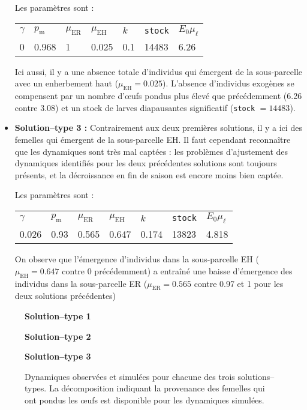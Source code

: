 \begin{itemize}
Les paramètres sont :
 \begin{center}
\begin{tabular}{lllllll}
$\gamma$ & $p_{\text{m}}$ & $\mu_{\text{ER}}$ & $\mu_{\text{EH}}$ & $k$ & \texttt{stock} & $E_0\mu_{\ell}$\\
0 & 0.968 & 1 & 0.025 & 0.1 & 14483 & 6.26
 \end{tabular}
 \end{center}
 Ici aussi, il y a une absence totale d'individus qui émergent de la sous-parcelle avec un enherbement haut ($\mu_{\text{EH}} = 0.025$).
 L'absence d'individus exogènes se compensent par un nombre d'œufs pondus plus élevé que précédemment (6.26 contre 3.08) et un stock de larves diapausantes significatif (\texttt{stock} $=14483$).
 
\item \textbf{Solution--type 3 :}
Contrairement aux deux premières solutions, il y a ici des femelles qui émergent de la sous-parcelle EH.
Il faut cependant reconnaître que les dynamiques sont très mal captées : les problèmes d'ajustement des dynamiques identifiés pour les deux précédentes solutions sont toujours présents, et la décroissance en fin de saison est encore moins bien captée.

Les paramètres sont :
 \begin{center}
\begin{tabular}{lllllll}
$\gamma$ & $p_{\text{m}}$ & $\mu_{\text{ER}}$ & $\mu_{\text{EH}}$ & $k$ & \texttt{stock} & $E_0\mu_{\ell}$\\
0.026 & 0.93 & 0.565 & 0.647 & 0.174 & 13823 & 4.818
 \end{tabular}
 \end{center}
On observe que l'émergence d'individus dans la sous-parcelle EH ($\mu_{\text{EH}} = 0.647$ contre 0 précédemment) a entraîné une baisse d'émergence des individus dans la sous-parcelle ER ($\mu_{\text{ER}} = 0.565$ contre 0.97 et 1 pour les deux solutions précédentes)
 
\end{itemize}



\begin{figure}[ht]
 \centering
 \textbf{Solution--type 1}
 
 
 \textbf{Solution--type 2}
 
 
 \textbf{Solution--type 3}
 
 \caption{Dynamiques observées et simulées pour chacune des trois solutions--types. La décomposition indiquant la provenance des femelles qui ont pondus les œufs est disponible pour les dynamiques simulées.}
 \label{fig:A1}
\end{figure}

